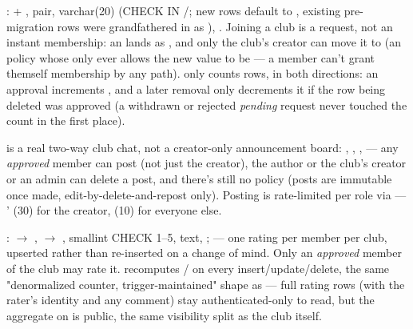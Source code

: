 :  + ,  pair,  varchar(20) (CHECK IN /; new rows default to , existing pre-migration rows were grandfathered in as ), . Joining a club is a request, not an instant membership: an  lands as , and only the club's creator can move it to  (an  policy whose  only ever allows the new value to be  — a member can't grant themself membership by any path).  only counts  rows, in both directions: an approval increments , and a later removal only decrements it if the row being deleted was approved (a withdrawn or rejected \emph{pending} request never touched the count in the first place).

 is a real two-way club chat, not a creator-only announcement board: , , ,  — any \emph{approved} member can post (not just the creator), the author or the club's creator or an admin can delete a post, and there's still no  policy (posts are immutable once made, edit-by-delete-and-repost only). Posting is rate-limited per role via  — '  (30) for the creator,  (10) for everyone else.

:  $\to$ ,  $\to$ ,  smallint CHECK 1--5,  text, ;  — one rating per member per club, upserted rather than re-inserted on a change of mind. Only an \emph{approved} member of the club may rate it.  recomputes / on every insert/update/delete, the same "denormalized counter, trigger-maintained" shape as  — full rating rows (with the rater's identity and any comment) stay authenticated-only to read, but the aggregate on  is public, the same visibility split as the club itself.


